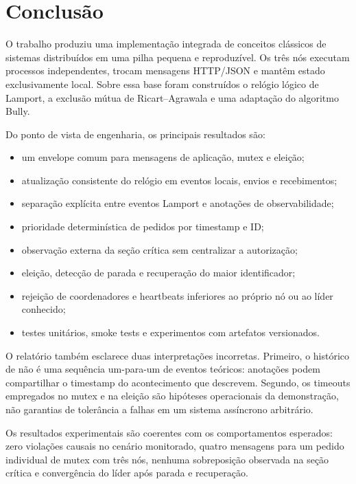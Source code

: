 \section{Conclusão}
\label{sec:conclusao}

O trabalho produziu uma implementação integrada de conceitos clássicos de sistemas distribuídos em uma pilha pequena e reproduzível. Os três nós executam processos independentes, trocam mensagens HTTP/JSON e mantêm estado exclusivamente local. Sobre essa base foram construídos o relógio lógico de Lamport, a exclusão mútua de Ricart--Agrawala e uma adaptação do algoritmo Bully.

Do ponto de vista de engenharia, os principais resultados são:

\begin{itemize}
    \item um envelope comum para mensagens de aplicação, mutex e eleição;
    \item atualização consistente do relógio em eventos locais, envios e recebimentos;
    \item separação explícita entre eventos Lamport e anotações de observabilidade;
    \item prioridade determinística de pedidos por timestamp e ID;
    \item observação externa da seção crítica sem centralizar a autorização;
    \item eleição, detecção de parada e recuperação do maior identificador;
    \item rejeição de coordenadores e heartbeats inferiores ao próprio nó ou ao líder conhecido;
    \item testes unitários, smoke tests e experimentos com artefatos versionados.
\end{itemize}

O relatório também esclarece duas interpretações incorretas. Primeiro, o histórico de  não é uma sequência um-para-um de eventos teóricos: anotações podem compartilhar o timestamp do acontecimento que descrevem. Segundo, os timeouts empregados no mutex e na eleição são hipóteses operacionais da demonstração, não garantias de tolerância a falhas em um sistema assíncrono arbitrário.

Os resultados experimentais são coerentes com os comportamentos esperados: zero violações causais no cenário monitorado, quatro mensagens para um pedido individual de mutex com três nós, nenhuma sobreposição observada na seção crítica e convergência do líder após parada e recuperação.

